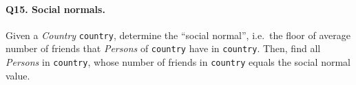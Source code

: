 \paragraph{\textbf{Q15}. Social normals.}
Given a \emph{Country} \texttt{country}, determine the ``social
normal'', i.e.~the floor of average number of friends that
\emph{Persons} of \texttt{country} have in \texttt{country}.
Then, find all \emph{Persons} in \texttt{country}, whose number of
friends in \texttt{country} equals the social normal value.
